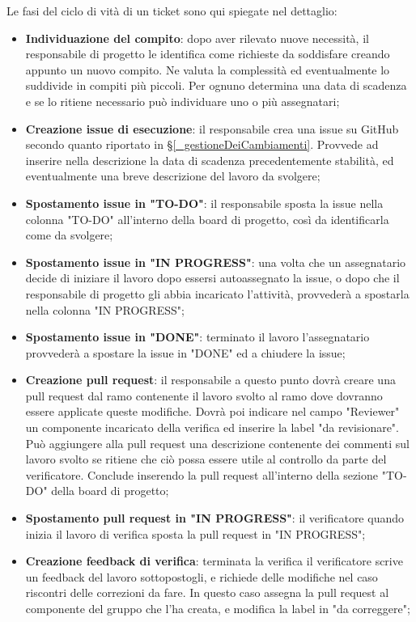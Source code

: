 Le fasi del ciclo di vità di un ticket sono qui spiegate nel dettaglio:
\begin{itemize}
    \item \textbf{Individuazione del compito}: dopo aver rilevato nuove necessità, il responsabile di progetto le identifica come richieste da soddisfare creando appunto un nuovo compito. Ne valuta la complessità ed eventualmente lo suddivide in compiti più piccoli. Per ognuno determina una data di scadenza e se lo ritiene necessario può individuare uno o più assegnatari;
    \item \textbf{Creazione issue di esecuzione}: il responsabile crea una issue su GitHub secondo quanto riportato in \S\ref{_gestioneDeiCambiamenti}. Provvede ad inserire nella descrizione la data di scadenza precedentemente stabilità, ed eventualmente una breve descrizione del lavoro da svolgere;
    \item \textbf{Spostamento issue in "TO-DO"}: il responsabile sposta la issue nella colonna "TO-DO" all'interno della board di progetto, così da identificarla come da svolgere;
    \item \textbf{Spostamento issue in "IN PROGRESS"}: una volta che un assegnatario decide di iniziare il lavoro dopo essersi autoassegnato la issue, o dopo che il responsabile di progetto gli abbia incaricato l'attività, provvederà a spostarla nella colonna "IN PROGRESS";
    \item \textbf{Spostamento issue in "DONE"}: terminato il lavoro l'assegnatario provvederà a spostare la issue in "DONE" ed a chiudere la issue;
    \item \textbf{Creazione pull request}: il responsabile a questo punto dovrà creare una pull request dal ramo contenente il lavoro svolto al ramo dove dovranno essere applicate queste modifiche. Dovrà poi indicare nel campo "Reviewer" un componente incaricato della verifica ed inserire la label "da revisionare". Può aggiungere alla pull request una descrizione contenente dei commenti sul lavoro svolto se ritiene che ciò possa essere utile al controllo da parte del verificatore. Conclude inserendo la pull request all'interno della sezione "TO-DO" della board di progetto;
    \item \textbf{Spostamento pull request in "IN PROGRESS"}: il verificatore quando inizia il lavoro di verifica sposta la pull request in "IN PROGRESS";
    \item \textbf{Creazione feedback di verifica}: terminata la verifica il verificatore scrive un feedback del lavoro sottopostogli, e richiede delle modifiche nel caso riscontri delle correzioni da fare. In questo caso assegna la pull request al componente del gruppo che l'ha creata, e modifica la label in "da correggere";

\end{itemize}
